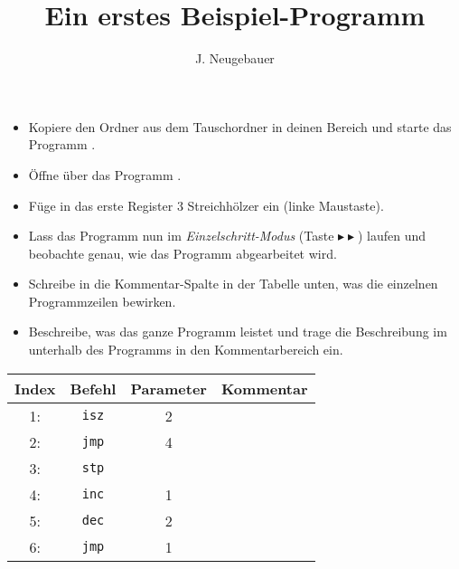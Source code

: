 \documentclass[10pt, a4paper]{scrartcl}
\author{J. Neugebauer}
\title{Ein erstes Beispiel-Programm}
\date{\Heute}
\begin{document}
\ReiheTitel

\begin{aufgabe}[symbol=\symLaptop]
	\label{afg:afg1}
	\begin{itemize}
		\item Kopiere den Ordner  aus dem Tauschordner in deinen Bereich und starte das Programm .
		\item Öffne über  das Programm .
		\item Füge in das erste Register 3 Streichhölzer ein (linke Maustaste).
		\item Lass das Programm nun im \emph{Einzelschritt-Modus} (Taste $\blacktriangleright\blacktriangleright$) laufen und beobachte genau, wie das Programm abgearbeitet wird.
	\end{itemize}
	
	\bigskip
	\begin{itemize}
		\item Schreibe in die Kommentar-Spalte in der Tabelle unten, was die einzelnen Programmzeilen bewirken.
		\item Beschreibe, was das ganze Programm leistet und trage die Beschreibung im  unterhalb des Programms in den Kommentarbereich ein.
	\end{itemize}
	
	\begin{center}
	\begin{tabularx}{.8\textwidth}{|c|c|c|X|}\hline
		\rowcolor{ngb.tabelle.kopf.hg}
		Index & Befehl & Parameter & Kommentar \\\hline
		1: & \texttt{isz} & 2 & \Zeilenabstand\\\hline
		2: & \texttt{jmp} & 4 & \Zeilenabstand\\\hline
		3: & \texttt{stp} &   & \Zeilenabstand\\\hline
		4: & \texttt{inc} & 1 & \Zeilenabstand\\\hline
		5: & \texttt{dec} & 2 & \Zeilenabstand\\\hline
		6: & \texttt{jmp} & 1 & \Zeilenabstand\\\hline
	\end{tabularx}
	\end{center}
\end{aufgabe}
\end{document}
